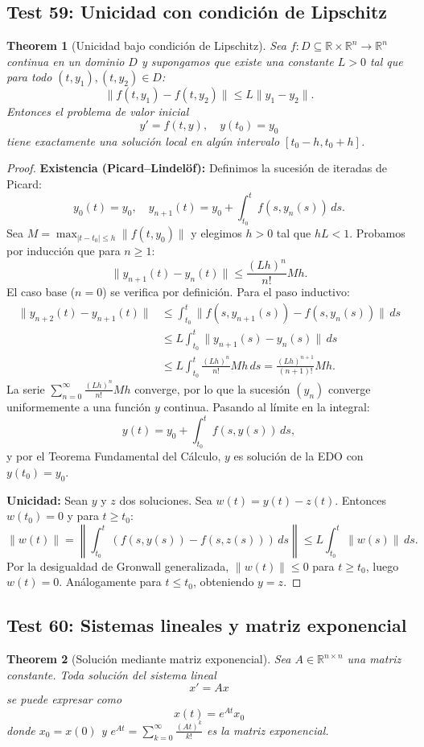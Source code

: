 \documentclass[11pt,a4paper]{article}
\theoremstyle{plain}
\newtheorem{theorem}{Theorem}[section]
\theoremstyle{definition}
\begin{document}
\subsection{Test 59: Unicidad con condición de Lipschitz}
\begin{theorem}[Unicidad bajo condición de Lipschitz]
Sea $f: D \subseteq \mathbb{R} \times \mathbb{R}^n \to \mathbb{R}^n$ continua en un dominio $D$ y supongamos que existe una constante $L > 0$ tal que para todo $(t, y_1), (t, y_2) \in D$:
\[
\|f(t, y_1) - f(t, y_2)\| \leq L \|y_1 - y_2\|.
\]
Entonces el problema de valor inicial
\[
y' = f(t, y), \quad y(t_0) = y_0
\]
tiene exactamente una solución local en algún intervalo $[t_0 - h, t_0 + h]$.
\end{theorem}

\begin{proof}
\textbf{Existencia (Picard--Lindelöf):} Definimos la sucesión de iteradas de Picard:
\[
y_0(t) = y_0, \quad y_{n+1}(t) = y_0 + \int_{t_0}^{t} f(s, y_n(s))\, ds.
\]
Sea $M = \max_{|t - t_0| \leq h} \|f(t, y_0)\|$ y elegimos $h > 0$ tal que $hL < 1$. Probamos por inducción que para $n \geq 1$:
\[
\|y_{n+1}(t) - y_n(t)\| \leq \frac{(Lh)^n}{n!} M h.
\]
El caso base ($n=0$) se verifica por definición. Para el paso inductivo:
\begin{align*}
\|y_{n+2}(t) - y_{n+1}(t)\| &\leq \int_{t_0}^{t} \|f(s, y_{n+1}(s)) - f(s, y_n(s))\|\, ds \\
&\leq L \int_{t_0}^{t} \|y_{n+1}(s) - y_n(s)\|\, ds \\
&\leq L \int_{t_0}^{t} \frac{(Lh)^n}{n!} M h\, ds = \frac{(Lh)^{n+1}}{(n+1)!} M h.
\end{align*}
La serie $\sum_{n=0}^{\infty} \frac{(Lh)^n}{n!} M h$ converge, por lo que la sucesión $(y_n)$ converge uniformemente a una función $y$ continua. Pasando al límite en la integral:
\[
y(t) = y_0 + \int_{t_0}^{t} f(s, y(s))\, ds,
\]
y por el Teorema Fundamental del Cálculo, $y$ es solución de la EDO con $y(t_0) = y_0$.

\textbf{Unicidad:} Sean $y$ y $z$ dos soluciones. Sea $w(t) = y(t) - z(t)$. Entonces $w(t_0) = 0$ y para $t \geq t_0$:
\[
\|w(t)\| = \left\|\int_{t_0}^{t} (f(s, y(s)) - f(s, z(s)))\, ds\right\| \leq L \int_{t_0}^{t} \|w(s)\|\, ds.
\]
Por la desigualdad de Gronwall generalizada, $\|w(t)\| \leq 0$ para $t \geq t_0$, luego $w(t) = 0$. Análogamente para $t \leq t_0$, obteniendo $y = z$.
\end{proof}

\subsection{Test 60: Sistemas lineales y matriz exponencial}
\begin{theorem}[Solución mediante matriz exponencial]
Sea $A \in \mathbb{R}^{n \times n}$ una matriz constante. Toda solución del sistema lineal
\[
x' = Ax
\]
se puede expresar como
\[
x(t) = e^{At} x_0
\]
donde $x_0 = x(0)$ y $e^{At} = \sum_{k=0}^{\infty} \frac{(At)^k}{k!}$ es la matriz exponencial.
\end{theorem}
\end{document}
